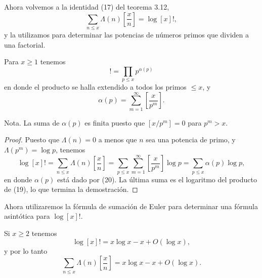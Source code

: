 \documentclass[12pt,a4paper]{book}
\begin{document}
    Ahora volvemos a la identidad (17) del teorema 3.12,
    \begin{equation*}
        \sum_{n\leq x}\Lambda(n)\left[\frac{x}{n}\right]=\log[x]!,
    \end{equation*}
    y la utilizamos para determinar las potencias de números primos que dividen a una
    factorial.

    \begin{teorema}
        Para $x\geq1$ tenemos
        \begin{equation}
            [x]!=\prod_{p\leq x}p^{\alpha(p)}
        \end{equation}
        en donde el producto se halla extendido a todos los primos $\leq x$, y
        \begin{equation}
            \alpha(p)=\sum_{m=1}^{\infty}\left[\frac{x}{p^m}\right].
        \end{equation}
    \end{teorema}

    Nota. La suma de $\alpha(p)$ es finita puesto que $[x/p^m]=0$ para $p^m>x$.

    \begin{proof}
        Puesto que $\Lambda(n)=0$ a menos que $n$ sea una potencia de primo, y
        $\Lambda(p^m)=\log p$, tenemos
        \begin{equation*}
            \log[x]!=\sum_{n\leq x}\Lambda(n)\left[\frac{x}{n}\right]
            =\sum_{p\leq x}\sum_{m=1}^{\infty}\left[\frac{x}{p^m}\right]\log p
            =\sum_{p\leq x}\alpha(p)\log p,
        \end{equation*}
        en donde $\alpha(p)$ está dado por (20). La última suma es el logaritmo del
        producto de (19), lo que termina la demostración.
    \end{proof}

    Ahora utilizaremos la fórmula de sumación de Euler para determinar una fórmula
    asintótica para $\log[x]!$.

    \begin{teorema}
        Si $x\geq2$ tenemos
        \begin{equation}
            \log[x]!=x\log x-x+O(\log x),
        \end{equation}
        y por lo tanto
        \begin{equation}
            \sum_{n\leq x}\Lambda(n)\left[\frac{x}{n}\right]=x\log x-x+O(\log x).
        \end{equation}
    \end{teorema}
\end{document}
